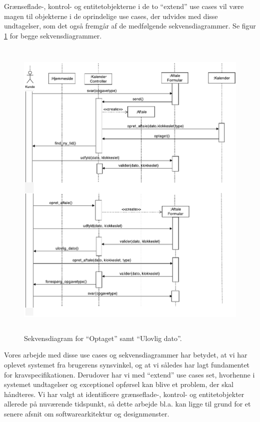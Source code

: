 \documentclass[12pt]{article}   %
\begin{document}
Grænseflade-, kontrol- og entitetobjekterne i de to ``extend'' use cases vil
være magen til objekterne i de oprindelige use cases, der udvides med disse
undtagelser, som det også fremgår af de medfølgende sekvensdiagrammer. Se figur
\ref{fig:extseq} for begge sekvensdiagrammer. \\

\begin{figure}[!ht]
	\begin{center}
\includegraphics[width=13cm, height=15cm]{ext.pdf}
\caption{Sekvensdiagram for ``Optaget'' samt  ``Ulovlig dato''.}
\label{fig:extseq}
\end{center}
\end{figure}

Vores arbejde med disse use cases og sekvensdiagrammer har betydet, at vi har oplevet systemet fra brugerens synsvinkel, og at vi således har lagt fundamentet for kravspecifikationen. Derudover har vi med ``extend'' use cases set, hvorhenne i systemet undtagelser og exceptionel opførsel kan blive et problem, der skal håndteres. Vi har valgt at identificere grænseflade-, kontrol- og entitetobjekter allerede på nuværende tidspunkt, så dette arbejde bl.a. kan ligge til grund for et senere afsnit om softwarearkitektur og designmønster. 
\end{document}
